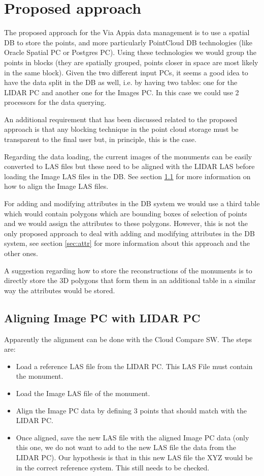 \documentclass[a4paper,11pt]{article}
\begin{document}
\section{Proposed approach}

The proposed approach for the Via Appia data management is to use a spatial DB to store the points, and more particularly PointCloud DB technologies (like Oracle Spatial PC or Postgres PC). Using these technologies we would group the points in blocks (they are spatially grouped, points closer in space are most likely in the same block). Given the two different input PCs, it seems a good idea to have the data split in the DB as well, i.e. by having two tables: one for the LIDAR PC and another one for the Images PC. In this case we could use 2 processors for the data querying.

An additional requirement that has been discussed related to the proposed approach is that any blocking technique in the point cloud storage must be transparent to the final user but, in principle, this is the case.

Regarding the data loading, the current images of the monuments can be easily converted to LAS files but these need to be aligned with the LIDAR LAS before loading the Image LAS files in the DB. See section \ref{sec:align} for more information on how to align the Image LAS files.

For adding and modifying attributes in the DB system we would use a third table which would contain polygons which are bounding boxes of selection of points and we would assign the attributes to these polygons. However, this is not the only proposed approach to deal with adding and modifying attributes in the DB system, see section \ref{sec:attr} for more information about this approach and the other ones.

A suggestion regarding how to store the reconstructions of the monuments is to directly store the 3D polygons that form them in an additional table in a similar way the attributes would be stored.

\subsection{Aligning Image PC with LIDAR PC}
\label{sec:align}

Apparently the alignment can be done with the Cloud Compare SW. The steps are:

\begin{itemize}
	\item Load a reference LAS file from the LIDAR PC. This LAS File must contain the monument.
	\item Load the Image LAS file of the monument.
	\item Align the Image PC data by defining 3 points that should match with the LIDAR PC.
	\item Once aligned, save the new LAS file with the aligned Image PC data (only this one, we do not want to add to the new LAS file the data from the LIDAR PC). Our hypothesis is that in this new LAS file the XYZ would be in the correct reference system. This still needs to be checked.

\end{itemize}
\end{document}
